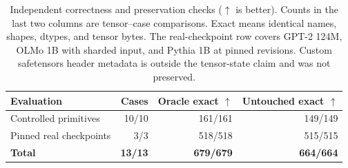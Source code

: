 \begin{table}[t]
  \centering
  \small
  \begin{tabular}{lrrr}
    \toprule
    \textbf{Evaluation} & \textbf{Cases} & \textbf{Oracle exact $\uparrow$} & \textbf{Untouched exact $\uparrow$} \\
    \midrule
    Controlled primitives & 10/10 & 161/161 & 149/149 \\
    Pinned real checkpoints & 3/3 & 518/518 & 515/515 \\
    \midrule
    \textbf{Total} & \textbf{13/13} & \textbf{679/679} & \textbf{664/664} \\
    \bottomrule
  \end{tabular}
  \caption{Independent correctness and preservation checks ($\uparrow$ is better). Counts in the last
  two columns are tensor--case comparisons. Exact means identical names,
  shapes, dtypes, and tensor bytes. The real-checkpoint row covers GPT-2 124M,
  OLMo 1B with sharded input, and Pythia 1B at pinned revisions. Custom
  safetensors header metadata is outside the tensor-state claim and was not
  preserved.}
  \label{tab:correctness-preservation}
\end{table}
